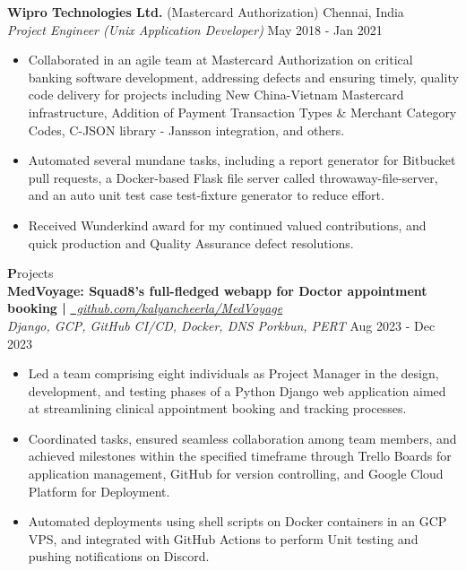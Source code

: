 \documentclass[a4paper]{article}
\begin{document}
\vspace*{-2mm}
\textbf{Wipro Technologies Ltd. }{(Mastercard Authorization)} \hfill {\small Chennai, India}\\
\textit{Project Engineer (Unix Application Developer)} \hfill {\small May 2018 - Jan 2021}\\
\vspace*{-2.5mm}
\begin{itemize} \itemsep -1mm
	\item Collaborated in an agile team at Mastercard Authorization on critical
	banking software development, addressing defects and ensuring timely,
	quality code delivery for projects including New China-Vietnam Mastercard
	infrastructure, Addition of Payment Transaction Types \& Merchant Category
	Codes, C-JSON library - Jansson integration, and others.
	\item Automated several mundane tasks, including a report generator for
	Bitbucket pull requests, a Docker-based Flask file server called
	throwaway-file-server, and an auto unit test case test-fixture generator to reduce effort.
	\item Received Wunderkind award for my continued valued contributions,
	and quick production and Quality Assurance defect resolutions.
\end{itemize}

\vspace*{-2mm}


{\textbf{P}rojects \hrulefill}\\

{\textbf{MedVoyage: Squad8's full-fledged webapp for Doctor appointment booking |}}
\href{https://github.com/kalyancheerla/MedVoyage}{\small\sl~github.com/kalyancheerla/MedVoyage}\\
\vspace*{-.5mm}
{\small {\sl Django, GCP, GitHub CI/CD, Docker, DNS Porkbun, PERT} \hfill Aug 2023 - Dec 2023}\\
\vspace*{-2.5mm}
\begin{itemize} \itemsep -1mm
	\item Led a team comprising eight individuals as Project Manager in the design, development, and testing phases of a Python Django web application aimed at streamlining clinical appointment booking and tracking processes.
	\item Coordinated tasks, ensured seamless collaboration among team members, and achieved milestones within the specified timeframe through Trello Boards for application management, GitHub for version controlling, and Google Cloud Platform for Deployment.
	\item Automated deployments using shell scripts on Docker containers in an GCP VPS, and integrated with GitHub Actions to perform Unit testing and pushing notifications on Discord.
\end{itemize}
\vspace*{-2mm}
\end{document}
